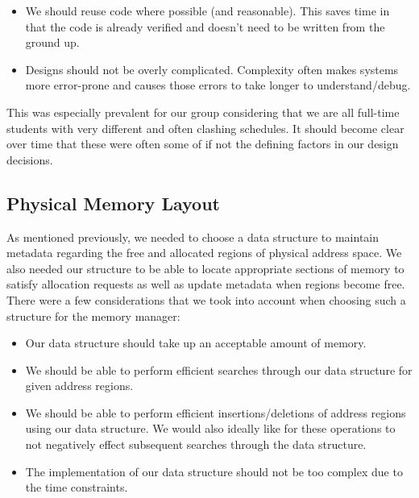 \begin{itemize}[itemsep=0pt]
    \item We should reuse code where possible (and reasonable). This saves time in that the code is already verified and doesn't need to be written from the ground up.
    \item Designs should not be overly complicated. Complexity often makes systems more error-prone and causes those errors to take longer to understand/debug.
\end{itemize}
This was especially prevalent for our group considering that we are all full-time students with very different and often clashing schedules. It should become clear over time that these were often some of if not the defining factors in our design decisions.

\subsection{Physical Memory Layout}\label{m1-3}
As mentioned previously, we needed to choose a data structure to maintain metadata regarding the free and allocated regions of physical address space. We also needed our structure to be able to locate appropriate sections of memory to satisfy allocation requests as well as update metadata when regions become free. There were a few considerations that we took into account when choosing such a structure for the memory manager:
\begin{itemize}[itemsep=0pt]
    \item Our data structure should take up an acceptable amount of memory.
    \item We should be able to perform efficient searches through our data structure for given address regions.
    \item We should be able to perform efficient insertions/deletions of address regions using our data structure. We would also ideally like for these operations to not negatively effect subsequent searches through the data structure.
    \item The implementation of our data structure should not be too complex due to the time constraints.
\end{itemize}


